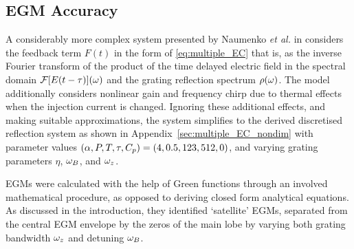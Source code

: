 \subsection{EGM Accuracy}
\label{subsec:naumenko}
A considerably more complex system presented by Naumenko \textit{et al.} in \cite{naumenko2003characteristics} considers the feedback term $F(t)$ in the form of \eqref{eq:multiple_EC} that is, as the inverse Fourier transform of the product of the time delayed electric field in the spectral domain $\mathcal{F}[E(t-\tau)](\omega)$ and the grating reflection spectrum $\rho(\omega)$. The model additionally considers nonlinear gain and frequency chirp due to thermal effects when the injection current is changed. Ignoring these additional effects, and making suitable approximations, the system simplifies to the derived discretised reflection system as shown in Appendix~\ref{sec:multiple_EC_nondim} with parameter values $(\alpha, P, T, \tau, C_p) = (4, 0.5, 123, 512, 0)$, and varying grating parameters $\eta$, $\omega_B$, and $\omega_z$.
%
\par
%
EGMs were calculated with the help of Green functions through an involved mathematical procedure, as opposed to deriving closed form analytical equations. As discussed in the introduction, they identified `satellite' EGMs, separated from the central EGM envelope by the zeros of the main lobe by varying both grating bandwidth $\omega_z$ and detuning $\omega_B$.
%

